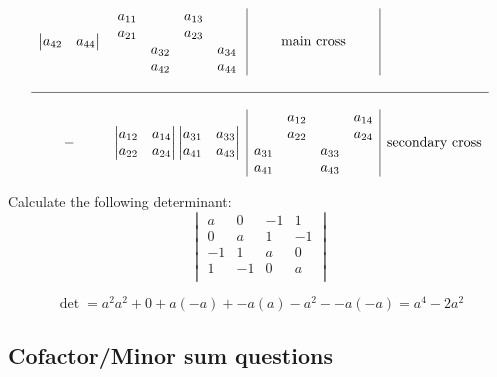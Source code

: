 \documentclass{overview}
\begin{document}
\[\begin{array}{c}
\begin{array}{cc|c|c}
\begin{vmatrix}
			a_{42} & a_{44} \\
		\end{vmatrix}
		 &
\begin{matrix}
	a_{11} &        & a_{13} &        \\
	a_{21} &        & a_{23} &        \\
         & a_{32} &        & a_{34} \\
         & a_{42} &        & a_{44} \\
\end{matrix}
		 & \text{main cross}
		\\ \\ \hline \\
		-&
		\begin{vmatrix}
			a_{12} & a_{14} \\
			a_{22} & a_{24} \\
		\end{vmatrix}
		\begin{vmatrix}
			a_{31} & a_{33} \\
			a_{41} & a_{43} \\
		\end{vmatrix}
		 &
\begin{matrix}
         & a_{12} &        & a_{14} \\
         & a_{22} &        & a_{24} \\
	a_{31} &        & a_{33} &        \\
	a_{41} &        & a_{43} &        \\
\end{matrix}
		 & \text{secondary cross}
	\end{array}
	\end{array}
\] 

\begin{example}
Calculate the following determinant:
\[
\begin{vmatrix}
	a & 0 & -1 & 1 \\
	0 & a & 1 & -1 \\
	-1 & 1 & a & 0 \\
	1 & -1 & 0 & a \\
\end{vmatrix}
\] 
\begin{answer}
	\[
	\det = a^2a^2+0+a(-a)+-a(a)-a^2--a(-a)=a^{4}-2a^2
	\] 
\end{answer}
\end{example}

\subsection{Cofactor/Minor sum questions}
\end{document}
